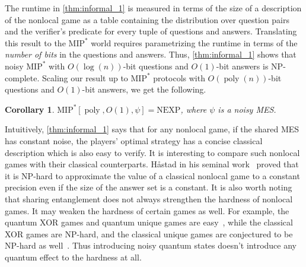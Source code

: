 \documentclass[10pt,a4paper]{article}
\theoremstyle{plain}
\newtheorem{cor}[theorem]{Corollary}
\theoremstyle{definition}
\newcommand{\poly} {\ensuremath{\operatorname{poly}}}
\newcommand{\1}{\mathbb{1}} %
\newcommand{\MIP}{\mathrm{MIP}}
\begin{document}
The runtime in \cref{thm:informal_1} is measured in terms of the size of a description of the nonlocal game as a table containing the distribution over question pairs and the verifier's predicate for every tuple of questions and answers. Translating this result to the $\MIP^*$ world requires parametrizing the runtime in terms of the \emph{number of bits} in the questions and answers. Thus, \cref{thm:informal_1} shows that noisy $\MIP^*$ with $O(\log(n))$-bit questions and $O(1)$-bit answers is $\mathrm{NP}$-complete.
Scaling our result up to $\MIP^\ast$ protocols with $O(\poly(n))$-bit questions and $O(1)$-bit answers, we get the following.
\begin{cor}
    $\MIP^\ast[\poly, O(1),\psi]=\mathrm{NEXP}$, where $\psi$ is a noisy MES.
\end{cor}
Intuitively, \cref{thm:informal_1} says that for any nonlocal game, if the shared MES has constant noise, the players' optimal strategy has a concise classical description which is also easy to verify. 
It is interesting to compare such nonlocal games with their classical counterparts. H\aa stad in his seminal work~\cite{hastad} proved that it is $\mathrm{NP}$-hard to approximate the value of a classical nonlocal game to a constant precision even if the size of the answer set is a constant.  It is also worth noting that sharing entanglement does not always strengthen the hardness of nonlocal games. It may weaken the hardness of certain games as well. For example, the quantum XOR games and quantum unique games are easy~\cite{1313847,doi:10.1137/090772885}, while the classical XOR games are $\mathrm{NP}$-hard, and the classical unique games are conjectured to be $\mathrm{NP}$-hard as well~\cite{10.1145/509907.510017}. 
Thus introducing noisy quantum states doesn't introduce any quantum effect to the hardness at all.
\end{document}

